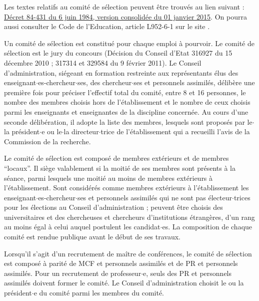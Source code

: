 Les textes relatifs au comit\'e de s\'election peuvent \^etre trouv\'es au lien suivant :
\href{http://www.legifrance.gouv.fr/affichTexte.do;jsessionid=E1D1583A8C612508D9955CAB27DB96E0.tpdjo12v_3&dateTexte%
=?cidTexte=JORFTEXT000000520453&categorieLien=cid}{D\'ecret 84-431 du 6 juin 1984, version consolid\'ee du 01 janvier 2015}. 
On pourra aussi consulter le Code de l'Education, article L952-6-1 sur le
site .


Un comit\'e de s\'election est constitu\'e pour chaque emploi \`a pourvoir. Le comit\'e de s\'election est le jury du concours 
(D\'ecision du Conseil d'Etat 316927 du 15 d\'ecembre 2010 ; 317314 et 329584 du 9 f\'evrier 2011). 
Le Conseil d'administration, si\'egeant en formation
restreinte aux repr\'esentants \'elus des enseignant$\cdot$es-chercheur$\cdot$ses, des chercheur$\cdot$ses et personnels assimil\'es, d\'elib\`ere
une premi\`ere fois pour pr\'eciser l'effectif total du comit\'e, entre 8 et 16 personnes, le nombre des membres choisis hors de
l'\'etablissement et le nombre de ceux choisis parmi les enseignants et enseignantes de la discipline concern\'ee. Au cours d'une
seconde d\'elib\'eration, il adopte la liste des membres, lesquels sont propos\'es par le$\cdot$la pr\'esident$\cdot$e ou le$\cdot$la directeur$\cdot$trice de
l'\'etablissement qui a recueilli l'avis de la Commission de la recherche.

Le comit\'e de s\'election est compos\'e de membres ext\'erieurs et de membres ``locaux''. Il si\`ege valablement si la moiti\'e de ses membres sont pr\'esents \`a la s\'eance, parmi lesquels une moiti\'e au moins de membres ext\'erieurs \`a l'\'etablissement. Sont consid\'er\'es comme membres ext\'erieurs \`a l'\'etablissement les enseignant$\cdot$es-chercheur$\cdot$ses et personnels assimil\'es qui ne sont pas \'electeur$\cdot$trices pour les \'elections
au Conseil d'administration ; peuvent \^etre choisis des universitaires et des chercheuses et chercheurs d'institutions \'etrang\`eres,
d'un rang au moins \'egal \`a celui auquel postulent les candidat$\cdot$es. La composition de chaque comit\'e est rendue
publique avant le d\'ebut de ses travaux.

Lorsqu'il s'agit d'un recrutement de ma\^itre de conf\'erences, le comit\'e de s\'election est compos\'e \`a parit\'e de MCF
et personnels assimil\'es et de PR et personnels assimil\'es. Pour un recrutement de professeur$\cdot$e, seuls des PR et
personnels assimil\'es doivent former le comit\'e. Le Conseil d'administration choisit le ou la pr\'esident$\cdot$e du comit\'e parmi les
membres du comit\'e.

